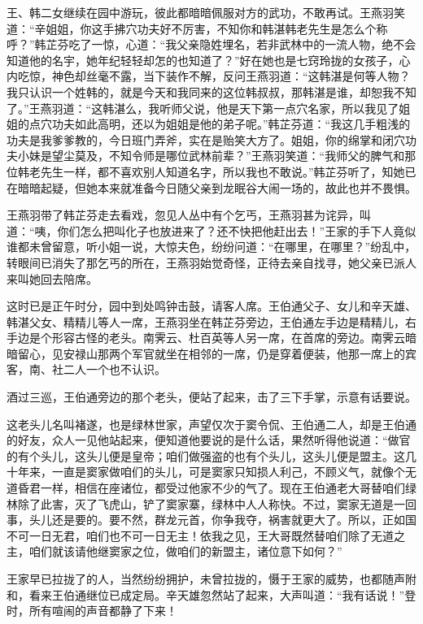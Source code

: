 \documentclass[12pt,oneside]{book}
\begin{document}
王、韩二女继续在园中游玩，彼此都暗暗佩服对方的武功，不敢再试。王燕羽笑道：``辛姐姐，你这手拂穴功夫好不厉害，不知你和韩湛韩老先生是怎么个称呼？''韩芷芬吃了一惊，心道：``我父亲隐姓埋名，若非武林中的一流人物，绝不会知道他的名宇，她年纪轻轻却怎的也知道了？''好在她也是七窍玲拢的女孩子，心内吃惊，神色却丝毫不露，当下装作不解，反问王燕羽道：``这韩湛是何等人物？我只认识一个姓韩的，就是今天和我同来的这位韩叔叔，那韩湛是谁，却恕我不知了。''王燕羽道：``这韩湛么，我听师父说，他是天下第一点穴名家，所以我见了姐姐的点穴功夫如此高明，还以为姐姐是他的弟子呢。''韩芷芬道：``我这几手粗浅的功夫是我爹爹教的，今日班门弄斧，实在是贻笑大方了。姐姐，你的绵掌和闭穴功夫小妹是望尘莫及，不知令师是哪位武林前辈？''王燕羽笑道：``我师父的脾气和那位韩老先生一样，都不喜欢别人知道名字，所以我也不敢说。''韩芷芬听了，知她已在暗暗起疑，但她本来就准备今日随父亲到龙眠谷大闹一场的，故此也并不畏惧。

王燕羽带了韩芷芬走去看戏，忽见人丛中有个乞丐，王燕羽甚为诧异，叫道：``咦，你们怎么把叫化子也放进来了？还不快把他赶出去！''王家的手下人竟似谁都未曾留意，听小姐一说，大惊夫色，纷纷问道：``在哪里，在哪里？''纷乱中，转眼间已消失了那乞丐的所在，王燕羽始觉奇怪，正待去亲自找寻，她父亲已派人来叫她回去陪席。

这时已是正午时分，园中到处鸣钟击鼓，请客人席。王伯通父子、女儿和辛天雄、韩湛父女、精精儿等人一席，王燕羽坐在韩芷芬旁边，王伯通左手边是精精儿，右手边是个形容古怪的老头。南霁云、杜百英等人另一席，在首席的旁边。南霁云暗暗留心，见安禄山那两个军官就坐在相邻的一席，仍是穿着便装，他那一席上的宾客，南、社二人一个也不认识。

酒过三巡，王伯通旁边的那个老头，便站了起来，击了三下手掌，示意有话要说。

这老头儿名叫褚遂，也是绿林世家，声望仅次于窦令侃、王伯通二人，却是王伯通的好友，众人一见他站起来，便知道他要说的是什么话，果然听得他说道：``做官的有个头儿，这头儿便是皇帝；咱们做强盗的也有个头儿，这头儿便是盟主。这几十年来，一直是窦家做咱们的头儿，可是窦家只知损人利己，不顾义气，就像个无道昏君一样，相信在座诸位，都受过他家不少的气了。现在王伯通老大哥替咱们绿林除了此害，灭了飞虎山，铲了窦家寨，绿林中人人称快。不过，窦家无道是一回事，头儿还是要的。要不然，群龙元首，你争我夺，祸害就更大了。所以，正如国不可一日无君，咱们也不可一日无主！依我之见，王大哥既然替咱们除了无道之主，咱们就该请他继窦家之位，做咱们的新盟主，诸位意下如何？''

王家早已拉拢了的人，当然纷纷拥护，未曾拉拢的，慑于王家的威势，也都随声附和，看来王伯通继位已成定局。辛天雄忽然站了起来，大声叫道：``我有话说！''登时，所有喧闹的声音都静了下来！
\end{document}
